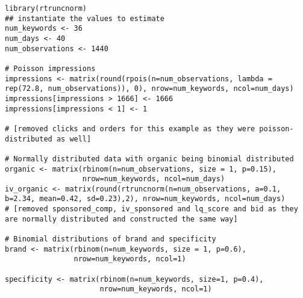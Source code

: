 \begin{lstlisting}[caption={Simulating the data}]
library(rtruncnorm)
## instantiate the values to estimate
num_keywords <- 36
num_days <- 40
num_observations <- 1440

# Poisson impressions
impressions <- matrix(round(rpois(n=num_observations, lambda = rep(72.8, num_observations)), 0), nrow=num_keywords, ncol=num_days)
impressions[impressions > 1666] <- 1666
impressions[impressions < 1] <- 1

# [removed clicks and orders for this example as they were poisson-distributed as well]

# Normally distributed data with organic being binomial distributed
organic <- matrix(rbinom(n=num_observations, size = 1, p=0.15),
                  nrow=num_keywords, ncol=num_days)
iv_organic <- matrix(round(rtruncnorm(n=num_observations, a=0.1, b=2.34, mean=0.42, sd=0.23),2), nrow=num_keywords, ncol=num_days)
# [removed sponsored_comp, iv_sponsored and lq_score and bid as they are normally distributed and constructed the same way]

# Binomial distributions of brand and specificity
brand <- matrix(rbinom(n=num_keywords, size = 1, p=0.6),
                nrow=num_keywords, ncol=1)

specificity <- matrix(rbinom(n=num_keywords, size=1, p=0.4),
                      nrow=num_keywords, ncol=1)

\end{lstlisting}